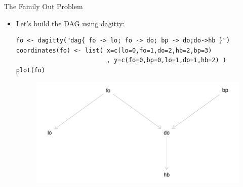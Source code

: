 \documentclass[handout]{beamer}
\begin{document}
\begin{frame}[fragile]{The Family Out Problem}
\scriptsize{



\begin{itemize}
\item Let's build the DAG using dagitty:

\begin{verbatim}
fo <- dagitty("dag{ fo -> lo; fo -> do; bp -> do;do->hb }")
coordinates(fo) <- list( x=c(lo=0,fo=1,do=2,hb=2,bp=3)
                         , y=c(fo=0,bp=0,lo=1,do=1,hb=2) )
plot(fo) 
\end{verbatim}

 \begin{figure}[h!]
	\centering
	\includegraphics[scale=0.6]{pics/fodagitty.pdf}
	\end{figure} 





 
\end{itemize}



} 

\end{frame}
\end{document}
